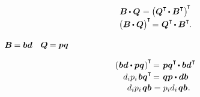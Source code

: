 \nopagebreak\vspace{-0.2em}\begin{equation}%
\begin{array}{c}
\bm{B} \hspace{-0.1ex} \dotp \bm{Q} \hspace{.1ex} = \bigl( \bm{Q}^{\T} \hspace{-0.2ex}\dotp \bm{B}^{\T} \bigr)^{\hspace{-0.25ex}\T}
\\[.1em]
\bigl( \bm{B} \hspace{-0.1ex} \dotp \bm{Q} \bigr)^{\hspace{-0.1ex}\T} \hspace{-0.3ex} = \hspace{.1ex} \bm{Q}^{\T} \hspace{-0.2ex}\dotp \bm{B}^{\T}
\hspace{-0.2ex} .
\end{array}
\end{equation}

{} ${\bm{B} \hspace{-0.1ex} = \bm{b}\bm{d}}$ ~${\bm{Q} \hspace{-0.1ex} = \bm{p}\bm{q}}$

\nopagebreak\vspace{-0.2em}\begin{equation*}
\begin{array}{r@{\hspace{.3em}}c@{\hspace{.3em}}l}
\left(\hspace{.1ex} \bm{b}\bm{d} \dotp \bm{p}\bm{q} \hspace{.1ex}\right)^{\hspace{-0.1ex}\T} & \hspace{-0.5ex} = & \hspace{-0.1ex} \bm{p}\bm{q}^{\T} \hspace{-0.25ex} \dotp \bm{b}\bm{d}^{\hspace{.1ex}\T}
\\[.2em]
d_i p_i \hspace{.25ex} \bm{b}\bm{q}^{\T} & \hspace{-0.5ex} = & \hspace{-0.1ex} \bm{q}\bm{p} \dotp \bm{d} \bm{b}
\\[.1em]
d_i p_i \hspace{.25ex} \bm{q}\bm{b} & = & p_i d_i \hspace{.25ex} \bm{q}\bm{b}
\hspace{.1ex} .
\end{array}
\end{equation*}

